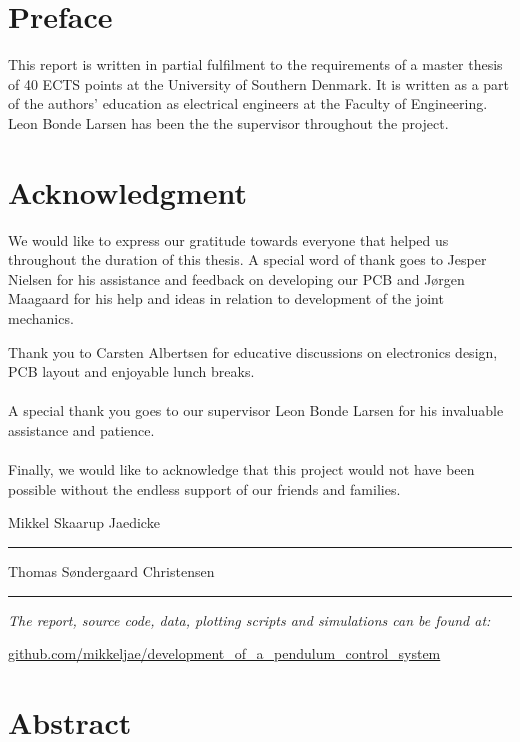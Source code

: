 
\section*{Preface}
This report is written in partial fulfilment to the requirements of a master thesis of 40 ECTS points at the University of Southern Denmark.
It is written as a part of the authors' education as electrical engineers at the Faculty of Engineering.
\\
Leon Bonde Larsen has been the the supervisor throughout the project.

\section*{Acknowledgment}

We would like to express our gratitude towards everyone that helped us throughout the duration of this thesis.
A special word of thank goes to Jesper Nielsen for his assistance and feedback on developing our PCB and Jørgen Maagaard for his help and ideas in relation to development of the joint mechanics. 

Thank you to Carsten Albertsen for educative discussions on electronics design, PCB layout and enjoyable lunch breaks. 
\\~\\
A special thank you goes to our supervisor Leon Bonde Larsen for his invaluable assistance and patience.
\\~\\
Finally, we would like to acknowledge that this project would not have been possible without the endless support of our friends and families.

\vspace{0.5cm}
\begin{center}
	\begin{minipage}[t]{.49\textwidth}\large
		\begin{center}
		Mikkel Skaarup Jaedicke\\
		\vspace{1cm}
		\hrule
		\vspace{0.5cm}
		Thomas Søndergaard Christensen
		\vspace{1cm}
		\hrule
		\end{center} 
	\end{minipage}
\end{center}

\vfill
  \begin{center}
    \textsl{The report, source code, data, plotting scripts and simulations can be found at:}  
    \end{center}
    \vspace{-5pt}
    \begin{center}
	\renewcommand{\UrlFont}{\color{black}\normalsize\tt}
    \url{github.com/mikkeljae/development_of_a_pendulum_control_system}
   \end{center}
\newpage

\section*{Abstract}


